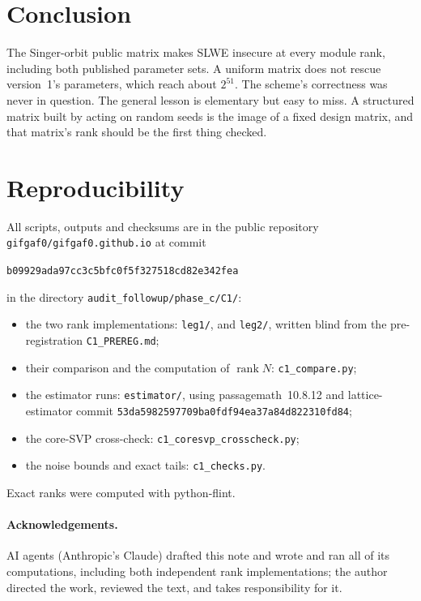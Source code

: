 \documentclass[11pt]{article}
\theoremstyle{remark}
\DeclareMathOperator{\rank}{rank}
\begin{document}
\section{Conclusion}

The Singer-orbit public matrix makes SLWE insecure at every module rank, including both published parameter sets. A
uniform matrix does not rescue version~1's parameters, which reach about $2^{51}$. The scheme's correctness was never in question. The general lesson is
elementary but easy to miss. A structured matrix built by acting on random seeds is the image of a fixed design matrix,
and that matrix's rank should be the first thing checked.

\section{Reproducibility}\label{sec:repro}

All scripts, outputs and checksums are in the public repository \texttt{gifgaf0/gifgaf0.github.io} at commit
\begin{center}\texttt{b09929ada97cc3c5bfc0f5f327518cd82e342fea}\end{center}
\noindent in the directory \texttt{audit\_followup/phase\_c/C1/}:
\begin{itemize}
\item the two rank implementations: \texttt{leg1/}, and \texttt{leg2/}, written blind from the pre-registration
  \texttt{C1\_PREREG.md};
\item their comparison and the computation of $\rank N$: \texttt{c1\_compare.py};
\item the estimator runs: \texttt{estimator/}, using passagemath~10.8.12 and lattice-estimator commit
  \texttt{53da5982597709ba0fdf94ea37a84d822310fd84};
\item the core-SVP cross-check: \texttt{c1\_coresvp\_crosscheck.py};
\item the noise bounds and exact tails: \texttt{c1\_checks.py}.
\end{itemize}
Exact ranks were computed with python-flint.

\paragraph{Acknowledgements.} AI agents (Anthropic's Claude) drafted this note and wrote and ran all of its computations, including both independent rank implementations; the author directed the work, reviewed the text, and takes responsibility for it.
\end{document}
